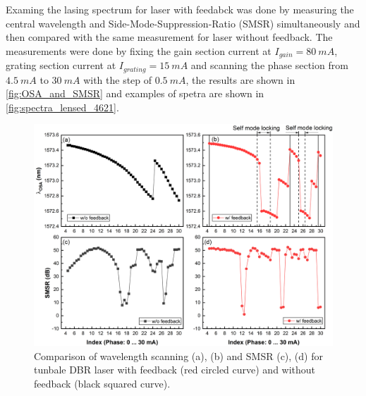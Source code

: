 Examing the lasing spectrum for laser with feedabck was done by measuring the central wavelength and Side-Mode-Suppression-Ratio (SMSR) simultaneously and then compared with the same measurement for laser without feedback. The measurements were done by fixing the gain section current at $I_{gain}=80 \ mA$, grating section current at $I_{grating}=15 \ mA$ and scanning the phase section from $4.5 \ mA$ to $30 \ mA$ with the step of $0.5 \ mA$, the results are shown in \autoref{fig:OSA_and_SMSR} and examples of spetra are shown in \autoref{fig:spectra_lensed_4621}. 

\begin{figure}[ht]
    \centering
    \includegraphics[width=\linewidth]{figures/OSA_and_SMSR.png}
    \caption{Comparison of wavelength scanning (a), (b) and SMSR (c), (d) for tunbale DBR laser with feedback (red circled curve) and without feedback (black squared curve).}
    \label{fig:OSA_and_SMSR}
\end{figure}








